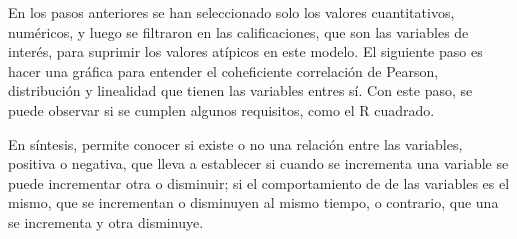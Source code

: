 \documentclass[
]{article}
\newenvironment{Shaded}{\begin{snugshade}}{\end{snugshade}}
\newcommand{\CommentTok}[1]{\textcolor[rgb]{0.56,0.35,0.01}{\textit{#1}}}
\newcommand{\DecValTok}[1]{\textcolor[rgb]{0.00,0.00,0.81}{#1}}
\newcommand{\FloatTok}[1]{\textcolor[rgb]{0.00,0.00,0.81}{#1}}
\newcommand{\FunctionTok}[1]{\textcolor[rgb]{0.13,0.29,0.53}{\textbf{#1}}}
\newcommand{\NormalTok}[1]{#1}
\newcommand{\OtherTok}[1]{\textcolor[rgb]{0.56,0.35,0.01}{#1}}
\newcommand{\SpecialCharTok}[1]{\textcolor[rgb]{0.81,0.36,0.00}{\textbf{#1}}}
\begin{document}
\begin{Shaded}
\end{Shaded}

En los pasos anteriores se han seleccionado solo los valores
cuantitativos, numéricos, y luego se filtraron en las calificaciones,
que son las variables de interés, para suprimir los valores atípicos en
este modelo. El siguiente paso es hacer una gráfica para entender el
coheficiente correlación de Pearson, distribución y linealidad que
tienen las variables entres sí. Con este paso, se puede observar si se
cumplen algunos requisitos, como el R cuadrado.

En síntesis, permite conocer si existe o no una relación entre las
variables, positiva o negativa, que lleva a establecer si cuando se
incrementa una variable se puede incrementar otra o disminuir; si el
comportamiento de de las variables es el mismo, que se incrementan o
disminuyen al mismo tiempo, o contrario, que una se incrementa y otra
disminuye.
\end{document}
